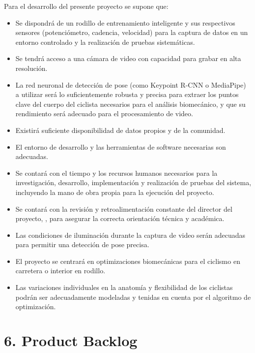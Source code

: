 \documentclass[
11pt, %
]{charter}
\begin{document}
Para el desarrollo del presente proyecto se supone que:
\begin{itemize}
\item Se dispondrá de un rodillo de entrenamiento inteligente y sus respectivos sensores (potenciómetro, cadencia, velocidad) para la captura de datos en un entorno controlado y la realización de pruebas sistemáticas.
\item Se tendrá acceso a una cámara de video con capacidad para grabar en alta resolución.
\item La red neuronal de detección de pose (como Keypoint R-CNN o MediaPipe) a utilizar será lo suficientemente robusta y precisa para extraer los puntos clave del cuerpo del ciclista necesarios para el análisis biomecánico, y que su rendimiento será adecuado para el procesamiento de video.
\item Existirá suficiente disponibilidad de datos propios y de la comunidad.
\item El entorno de desarrollo y las herramientas de software necesarias son adecuadas.
\item Se contará con el tiempo y los recursos humanos necesarios para la investigación, desarrollo, implementación y realización de pruebas del sistema, incluyendo la mano de obra propia para la ejecución del proyecto.
\item Se contará con la revisión y retroalimentación constante del director del proyecto, \supname	, para asegurar la correcta orientación técnica y académica.
\item Las condiciones de iluminación durante la captura de video serán adecuadas para permitir una detección de pose precisa.
\item El proyecto se centrará en optimizaciones biomecánicas para el ciclismo en carretera o interior en rodillo.
\item Las variaciones individuales en la anatomía y flexibilidad de los ciclistas podrán ser adecuadamente modeladas y tenidas en cuenta por el algoritmo de optimización.
\end{itemize}

\section{6. Product Backlog}
\label{sec:backlog}
\end{document}
